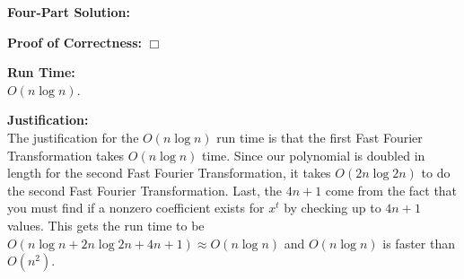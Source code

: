 \documentclass[11pt]{article}
\def\endproofmark{$\Box$}
\newenvironment{FourPartSolution}{\par{\bf Four-Part Solution:}}{\smallskip}
\newenvironment{proofOfCorrectness}{\par{\bf Proof of Correctness:}}{\endproofmark\smallskip}
\newenvironment{runTime}{\par{\bf Run Time:}}{\smallskip}
\newenvironment{justification}{\par{\bf Justification:}}{\smallskip}
\begin{document}
\begin{FourPartSolution}
\begin{proofOfCorrectness}
\end{proofOfCorrectness}
\\
\begin{runTime}
\\
$O(n\log{n})$.
\end{runTime}
\\
\begin{justification}
\\
The justification for the $O(n\log{n})$ run time is that the first Fast Fourier Transformation takes $O(n\log{n})$ time. Since our polynomial is doubled in length for the second Fast Fourier Transformation, it takes $O(2n\log{2n})$ to do the second Fast Fourier Transformation. Last, the $4n + 1$ come from the fact that you must find if a nonzero coefficient exists for $x^t$ by checking up to $4n + 1$ values. This gets the run time to be $O(n\log{n} + 2n\log{2n} + 4n + 1) \approx O(n\log{n})$ and $O(n\log{n})$ is faster than $O(n^2)$.
\end{justification}
\end{FourPartSolution}



\newpage
\end{document}
